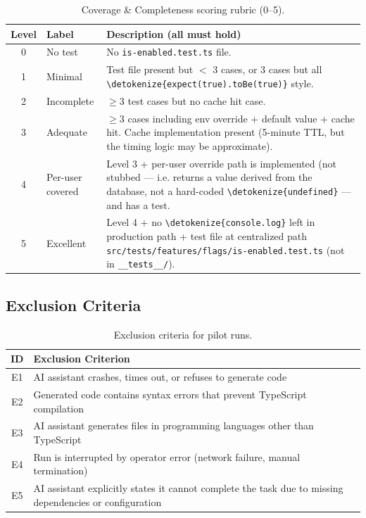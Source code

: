 \documentclass[12pt,a4paper]{report}
\newcommand{\code}[1]{\texttt{\nolinkurl{\detokenize{#1}}}}
\DeclareRobustCommand{\filename}[1]{\bgroup\urlstyle{tt}\nolinkurl{#1}\egroup}
\begin{document}
\begin{table}[H]
\centering
\begin{tabular}{clp{9cm}}
\toprule
\textbf{Level} & \textbf{Label} & \textbf{Description (all must hold)} \\
\midrule
0 & No test & No \filename{is-enabled.test.ts} file. \\
1 & Minimal & Test file present but $<$ 3 cases, or 3 cases but all \code{expect(true).toBe(true)} style. \\
2 & Incomplete & $\geq 3$ test cases but no cache hit case. \\
3 & Adequate & $\geq 3$ cases including env override + default value + cache hit. Cache implementation present (5-minute TTL, but the timing logic may be approximate). \\
4 & Per-user covered & Level 3 + per-user override path is implemented (not stubbed --- i.e. returns a value derived from the database, not a hard-coded \code{undefined} --- and has a test. \\
5 & Excellent & Level 4 + no \code{console.log} left in production path + test file at centralized path \filename{src/tests/features/flags/is-enabled.test.ts} (not in \filename{\_\_tests\_\_/}). \\
\bottomrule
\end{tabular}
\caption{Coverage \& Completeness scoring rubric (0--5).}
\label{tab:rubric-cov}
\end{table}

\subsection{Exclusion Criteria}
\label{sec:pilot-exclusion}

\begin{table}[H]
\centering
\begin{tabular}{cp{10cm}}
\toprule
\textbf{ID} & \textbf{Exclusion Criterion} \\
\midrule
E1 & AI assistant crashes, times out, or refuses to generate code \\
E2 & Generated code contains syntax errors that prevent TypeScript compilation \\
E3 & AI assistant generates files in programming languages other than TypeScript \\
E4 & Run is interrupted by operator error (network failure, manual termination) \\
E5 & AI assistant explicitly states it cannot complete the task due to missing dependencies or configuration \\
\bottomrule
\end{tabular}
\caption{Exclusion criteria for pilot runs.}
\label{tab:exclusion-criteria}
\end{table}
\end{document}
